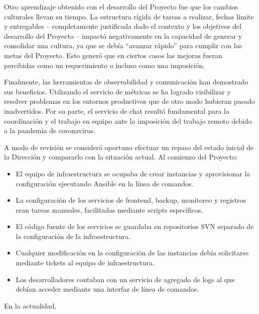 Otro aprendizaje obtenido con el desarrollo del Proyecto fue que los
cambios culturales llevan su tiempo. La estructura rígida de tareas a
realizar, fechas límite y entregables -- completamente justificada
dado el contexto y los objetivos del desarrollo del Proyecto --
impactó negativamente en la capacidad de generar y consolidar una
cultura, ya que se debía ``avanzar rápido'' para cumplir con las metas
del Proyecto. Esto generó que en ciertos casos las mejoras fueran
percibidas como un requerimiento o incluso como una imposición.

Finalmente, las herramientas de observabilidad y comunicación han
demostrado sus beneficios. Utilizando el servicio de métricas se ha
logrado visibilizar y resolver problemas en los entornos productivos
que de otro modo hubieran pasado inadvertidos. Por su parte, el
servicio de chat resultó fundamental para la coordinación y el trabajo
en equipo ante la imposición del trabajo remoto debido a la pandemia
de coronavirus.

A modo de revisión se consideró oportuno efectuar un repaso del estado
inicial de la Dirección y compararlo con la situación actual. Al
comienzo del Proyecto:

\begin{itemize}
\item El equipo de infraestructura se ocupaba de crear instancias y
  aprovisionar la configuración ejecutando Ansible en la línea de
  comandos.
\item La configuración de los servicios de frontend, backup, monitoreo
  y registros eran tareas manuales, facilitadas mediante scripts
  específicos.
\item El código fuente de los servicios se guardaba en repositorios
  SVN separado de la configuración de la infraestructura.
\item Cualquier modificación en la configuración de las instancias
  debía solicitarse mediante tickets al equipo de infraestructura.
\item Los desarrolladores contaban con un servicio de agregado de logs
  al que debían acceder mediante una interfaz de línea de comandos.
\end{itemize}
En la actualidad,

